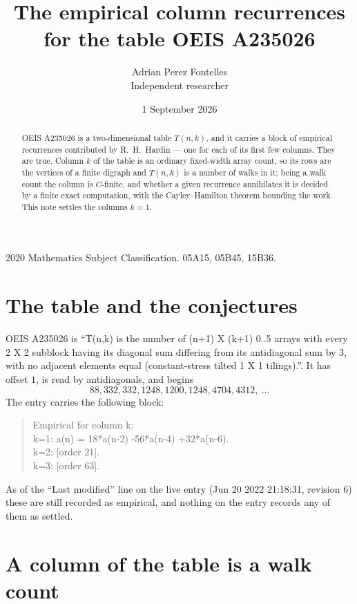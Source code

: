 \documentclass[11pt,a4paper]{article}
\title{The empirical column recurrences for the table OEIS A235026}
\author{Adrian Perez Fontelles\\ \small Independent researcher}
\date{1 September 2026}
\theoremstyle{plain}
\theoremstyle{definition}
\begin{document}
\maketitle

\begin{abstract}
OEIS A235026 is a two-dimensional table $T(n,k)$, and it carries a block of empirical
recurrences contributed by R.~H.~Hardin --- one for each of its first few columns. They are
true. Column $k$ of the table is an ordinary fixed-width array count, so its rows are the
vertices of a finite digraph and $T(n,k)$ is a number of walks in it; being a walk count the
column is $C$-finite, and whether a given recurrence annihilates it is decided by a finite
exact computation, with the Cayley--Hamilton theorem bounding the work. This note settles the columns $k=1$.
\end{abstract}

\noindent\small 2020 Mathematics Subject Classification. 05A15, 05B45, 15B36.\normalsize

\section{The table and the conjectures}

OEIS A235026 is ``T(n,k) is the number of (n+1) X (k+1) 0..5 arrays with every 2 X 2 subblock having its diagonal sum differing from its antidiagonal sum by 3, with no adjacent elements equal (constant-stress tilted 1 X 1 tilings).''. It has offset $1$, is
read by antidiagonals, and begins
\[
88, 332, 332, 1248, 1200, 1248, 4704, 4312,\ \dots
\]
The entry carries the following block:
\begin{quote}\small
Empirical for column k:\\
k=1: a(n) = 18*a(n-2) -56*a(n-4) +32*a(n-6).\\
k=2: [order 21].\\
k=3: [order 63].\\
\end{quote}
As of the ``Last modified'' line on the live entry (Jun 20 2022 21:18:31, revision 6) these are still
recorded as empirical, and nothing on the entry records any of them as settled.

\section{A column of the table is a walk count}
\end{document}
